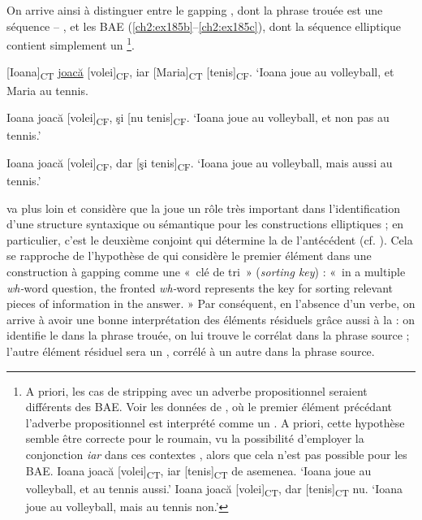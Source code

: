 On arrive ainsi à distinguer entre le gapping , dont la phrase trouée est une séquence  -- , et les BAE (\ref{ch2:ex185b}--\ref{ch2:ex185c}), dont la séquence elliptique contient simplement un \footnote{
 A priori, les cas de stripping avec un adverbe propositionnel seraient différents des BAE. Voir les données de \citet{KonietzkoEtAl2010}, où le premier élément précédant l’adverbe propositionnel est interprété comme un . A priori, cette hypothèse semble être correcte pour le roumain, vu la possibilité d’employer la conjonction \textit{iar} dans ces contextes , alors que cela n’est pas possible pour les BAE. 
 \ea \label{ch2:foot56i}
 \ea Ioana joacă [volei]\textsubscript{CT}, iar [tenis]\textsubscript{CT} de asemenea.
 \glt ‘Ioana joue au volleyball, et au tennis aussi.’
 \ex Ioana joacă [volei]\textsubscript{CT}, dar [tenis]\textsubscript{CT} nu.
 \glt ‘Ioana joue au volleyball, mais au tennis non.’
\z\z}.   


\ea 
\ea{} [Ioana]\textsubscript{CT} \uline{joacă} [volei]\textsubscript{CF}, iar [Maria]\textsubscript{CT} [tenis]\textsubscript{CF}. \label{ch2:ex185a}
\glt ‘Ioana joue au volleyball, et Maria au tennis.


\ex Ioana joacă [volei]\textsubscript{CF}, şi [nu tenis]\textsubscript{CF}. \label{ch2:ex185b} 
\glt ‘Ioana joue au volleyball, et non pas au tennis.’    

\ex Ioana joacă [volei]\textsubscript{CF}, dar [şi tenis]\textsubscript{CF}. \label{ch2:ex185c} 
\glt ‘Ioana joue au volleyball, mais aussi au tennis.’
\z
\z

\citet{Schwabe2000} va plus loin et considère que la  joue un rôle très important dans l’identification d’une structure syntaxique ou sémantique pour les constructions elliptiques ; en particulier, c’est le deuxième conjoint qui détermine la  de l’antécédent (cf. \citealt{Rooth1992,Rooth1996}). Cela se rapproche de l’hypothèse de \citet[141]{Kuno1982} qui considère le premier élément dans une construction à gapping comme une «~clé de tri~» (\textit{sorting key}) : «~in a multiple \textit{wh-}word question, the fronted \textit{wh-}word represents the key for sorting relevant pieces of information in the answer. » Par conséquent, en l’absence d’un verbe, on arrive à avoir une bonne interprétation des éléments résiduels grâce aussi à la  : on identifie le  dans la phrase trouée, on lui trouve le corrélat dans la phrase source ; l’autre élément résiduel sera un , corrélé à un autre  dans la phrase source. 

